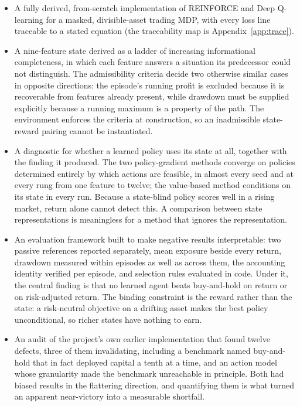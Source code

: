 \begin{itemize}
  \item A fully derived, from-scratch implementation of REINFORCE and
        Deep Q-learning for a masked, divisible-asset trading MDP, with
        every loss line traceable to a stated equation (the traceability
        map is Appendix~\ref{app:trace}).
  \item A nine-feature state derived as a ladder of increasing
        informational completeness, in which each feature answers a
        situation its predecessor could not distinguish. The admissibility
        criteria decide two otherwise similar cases in opposite
        directions: the episode's running profit is excluded because it is
        recoverable from features already present, while drawdown must be
        supplied explicitly because a running maximum is a property of the
        path. The environment enforces the criteria at construction, so an
        inadmissible state-reward pairing cannot be instantiated.
  \item A diagnostic for whether a learned policy uses its state at all,
        together with the finding it produced. The two policy-gradient
        methods converge on policies determined entirely by which actions
        are feasible, in almost every seed and at every rung from one
        feature to twelve; the value-based method conditions on its
        state in every run. Because a state-blind policy scores well in a
        rising market, return alone cannot detect this. A comparison
        between state representations is meaningless for a method that
        ignores the representation.
  \item An evaluation framework built to make negative results
        interpretable: two passive references reported separately, mean
        exposure beside every return, drawdown measured within episodes as
        well as across them, the accounting identity verified per episode,
        and selection rules evaluated in code. Under it, the central finding
        is that no learned agent beats buy-and-hold on return or on
        risk-adjusted return. The binding constraint is the reward
        rather than the state: a risk-neutral objective on a drifting asset
        makes the best policy unconditional, so richer states have nothing
        to earn.
  \item An audit of the project's own earlier implementation that found
        twelve defects, three of them invalidating, including a benchmark
        named buy-and-hold that in fact deployed capital a tenth at a time,
        and an action model whose granularity made the benchmark
        unreachable in principle. Both had biased results in the flattering
        direction, and quantifying them is what turned an apparent
        near-victory into a measurable shortfall.
\end{itemize}

